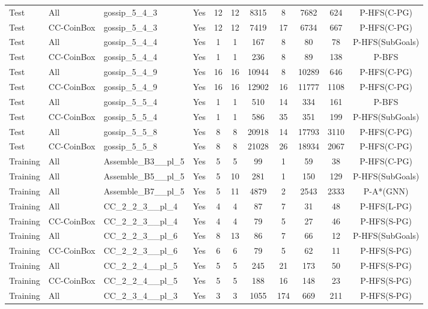 \documentclass{article}
\begin{document}
\begin{tabular}{lllcccccccc}
Test & All & gossip\_5\_4\_3 & Yes & 12 & 12 & 8315 & 8 & 7682 & 624 & P-HFS(C-PG) \\
Test & CC-CoinBox & gossip\_5\_4\_3 & Yes & 12 & 12 & 7419 & 17 & 6734 & 667 & P-HFS(C-PG) \\
Test & All & gossip\_5\_4\_4 & Yes & 1 & 1 & 167 & 8 & 80 & 78 & P-HFS(SubGoals) \\
Test & CC-CoinBox & gossip\_5\_4\_4 & Yes & 1 & 1 & 236 & 8 & 89 & 138 & P-BFS \\
Test & All & gossip\_5\_4\_9 & Yes & 16 & 16 & 10944 & 8 & 10289 & 646 & P-HFS(C-PG) \\
Test & CC-CoinBox & gossip\_5\_4\_9 & Yes & 16 & 16 & 12902 & 16 & 11777 & 1108 & P-HFS(C-PG) \\
Test & All & gossip\_5\_5\_4 & Yes & 1 & 1 & 510 & 14 & 334 & 161 & P-BFS \\
Test & CC-CoinBox & gossip\_5\_5\_4 & Yes & 1 & 1 & 586 & 35 & 351 & 199 & P-HFS(SubGoals) \\
Test & All & gossip\_5\_5\_8 & Yes & 8 & 8 & 20918 & 14 & 17793 & 3110 & P-HFS(C-PG) \\
Test & CC-CoinBox & gossip\_5\_5\_8 & Yes & 8 & 8 & 21028 & 26 & 18934 & 2067 & P-HFS(C-PG) \\
Training & All & Assemble\_B3\_\_pl\_5 & Yes & 5 & 5 & 99 & 1 & 59 & 38 & P-HFS(C-PG) \\
Training & All & Assemble\_B5\_\_pl\_5 & Yes & 5 & 10 & 281 & 1 & 150 & 129 & P-HFS(SubGoals) \\
Training & All & Assemble\_B7\_\_pl\_5 & Yes & 5 & 11 & 4879 & 2 & 2543 & 2333 & P-A*(GNN) \\
Training & All & CC\_2\_2\_3\_\_pl\_4 & Yes & 4 & 4 & 87 & 7 & 31 & 48 & P-HFS(L-PG) \\
Training & CC-CoinBox & CC\_2\_2\_3\_\_pl\_4 & Yes & 4 & 4 & 79 & 5 & 27 & 46 & P-HFS(S-PG) \\
Training & All & CC\_2\_2\_3\_\_pl\_6 & Yes & 8 & 13 & 86 & 7 & 66 & 12 & P-HFS(SubGoals) \\
Training & CC-CoinBox & CC\_2\_2\_3\_\_pl\_6 & Yes & 6 & 6 & 79 & 5 & 62 & 11 & P-HFS(S-PG) \\
Training & All & CC\_2\_2\_4\_\_pl\_5 & Yes & 5 & 5 & 245 & 21 & 173 & 50 & P-HFS(S-PG) \\
Training & CC-CoinBox & CC\_2\_2\_4\_\_pl\_5 & Yes & 5 & 5 & 188 & 16 & 148 & 23 & P-HFS(S-PG) \\
Training & All & CC\_2\_3\_4\_\_pl\_3 & Yes & 3 & 3 & 1055 & 174 & 669 & 211 & P-HFS(S-PG) \\

\end{tabular}
\end{document}
